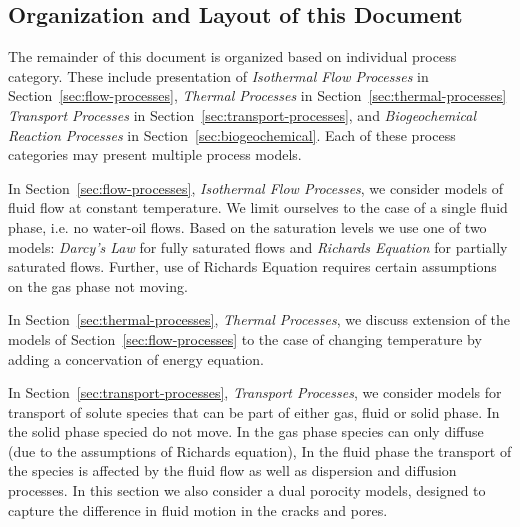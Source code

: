 \subsection{Organization and Layout of this Document}
\label{sec:layout}

The remainder of this document is organized based on individual process category.
These include presentation of
\emph{Isothermal Flow Processes} in Section~\ref{sec:flow-processes}, 
\emph{Thermal Processes} in Section~\ref{sec:thermal-processes}
\emph{Transport Processes} in Section~\ref{sec:transport-processes}, and 
\emph{Biogeochemical Reaction Processes} in Section~\ref{sec:biogeochemical}. 
%
Each of these process categories may present multiple process models.  


In Section~\ref{sec:flow-processes}, \emph{Isothermal Flow Processes}, 
we consider models of fluid flow at constant temperature.
We limit ourselves to the case of a single fluid phase, i.e. no water-oil flows.
Based on the saturation levels we use one of two models:
\emph{Darcy's Law} for fully saturated flows and
\emph{Richards Equation} for partially saturated flows.
Further, use of Richards Equation requires certain assumptions on the gas phase not moving.

In Section~\ref{sec:thermal-processes}, \emph{Thermal Processes},
we discuss extension of the models of Section~\ref{sec:flow-processes}
to the case of changing temperature by adding a concervation of energy equation.


In Section~\ref{sec:transport-processes}, \emph{Transport Processes},
we consider models for transport of solute species 
that can be part of either gas, fluid or solid phase.
In the solid phase specied do not move.
In the gas phase species can only diffuse (due to the assumptions of Richards equation),
In the fluid phase the transport of the species is affected by the 
fluid flow as well as dispersion and diffusion processes. 
In this section we also consider a dual porocity models,
designed to capture the difference in fluid motion in the cracks and pores.  
 

